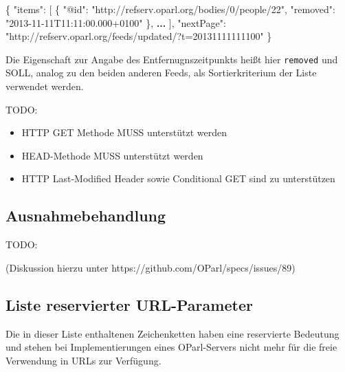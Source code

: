 \documentclass[,a4paper]{article}
\newenvironment{Shaded}{}{}
\newcommand{\DataTypeTok}[1]{\textcolor[rgb]{0.56,0.13,0.00}{{#1}}}
\newcommand{\StringTok}[1]{\textcolor[rgb]{0.25,0.44,0.63}{{#1}}}
\newcommand{\ErrorTok}[1]{\textcolor[rgb]{1.00,0.00,0.00}{\textbf{{#1}}}}
\newcommand{\NormalTok}[1]{{#1}}
\begin{document}
\begin{Shaded}
\begin{Highlighting}[]
\NormalTok{\{}
    \DataTypeTok{"items"}\NormalTok{: [}
        \NormalTok{\{}
            \DataTypeTok{"@id"}\NormalTok{: }\StringTok{"http://refserv.oparl.org/bodies/0/people/22"}\NormalTok{,}
            \DataTypeTok{"removed"}\NormalTok{: }\StringTok{"2013-11-11T11:11:00.000+0100"}
        \NormalTok{\},}
        \ErrorTok{...}
    \NormalTok{],}
    \DataTypeTok{"nextPage"}\NormalTok{: }\StringTok{"http://refserv.oparl.org/feeds/updated/?t=20131111111100"}
\NormalTok{\}}
\end{Highlighting}
\end{Shaded}

Die Eigenschaft zur Angabe des Entfernugnszeitpunkts heißt hier
\texttt{removed} und SOLL, analog zu den beiden anderen Feeds, als
Sortierkriterium der Liste verwendet werden.


TODO:

\begin{itemize}
\itemsep1pt\parskip0pt
\item
  HTTP GET Methode MUSS unterstützt werden
\item
  HEAD-Methode MUSS unterstützt werden
\item
  HTTP Last-Modified Header sowie Conditional GET sind zu unterstützen
\end{itemize}

\subsection{Ausnahmebehandlung}\label{ausnahmebehandlung}

TODO:

(Diskussion hierzu unter https://github.com/OParl/specs/issues/89)

\subsection{Liste reservierter
URL-Parameter}\label{liste-reservierter-url-parameter}

Die in dieser Liste enthaltenen Zeichenketten haben eine reservierte
Bedeutung und stehen bei Implementierungen eines OParl-Servers nicht
mehr für die freie Verwendung in URLs zur Verfügung.
\end{document}
